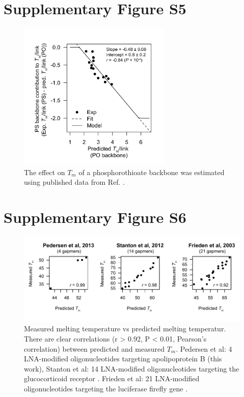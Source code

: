 \documentclass[a4paper,11pt]{article}
\newenvironment{Ncenter}{%
  \setlength\topsep{-10pt}
  \setlength\parskip{-100pt}
  \begin{center}
}{%
  \end{center}
}
\begin{document}
\section{Supplementary Figure S5}
\begin{figure}[!h]
\begin{Ncenter}
\includegraphics[width=0.65\textwidth]{SuppFig_PS.pdf}
\end{Ncenter}
\caption{The effect on $T_m$ of a phosphorothioate backbone was estimated using published data from Ref. \cite{Hashem:1998kf}.}\label{fig:figPS}
\end{figure}

\section{Supplementary Figure S6}
\begin{figure}[!h]
\begin{Ncenter}
\includegraphics[width=\textwidth]{SuppFigS3.pdf}
\end{Ncenter}
\caption{Measured melting temperature vs predicted melting temperatur. There are clear correlations (r > 0.92, P < 0.01, Pearson's correlation) between predicted and measured $T_m$. Pedersen et al: 4 LNA-modified oligonucleotides targeting apolipoprotein B (this work), Stanton et al: 14 LNA-modified oligonucleotides targeting the glucocorticoid receptor \cite{Stanton:2012fu}. Frieden et al: 21 LNA-modified oligonucleotides targeting the luciferase firefly gene \cite{Frieden:2003er}.}\label{fig:figTm}
\end{figure}

\newpage

\end{document}
